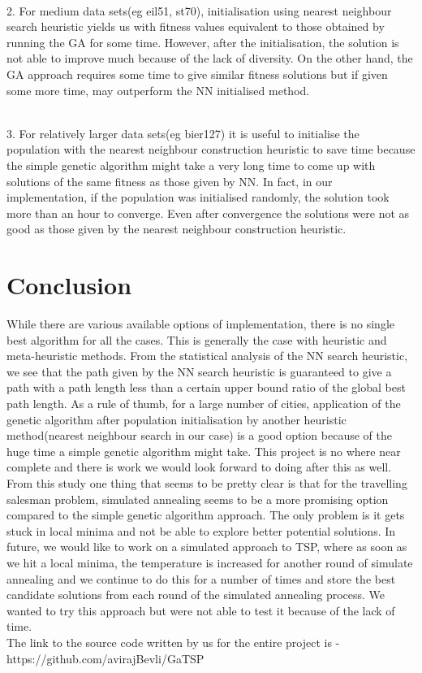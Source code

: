 \documentclass{article}
\begin{document}
\\2.  For medium data sets(eg eil51, st70), initialisation using nearest neighbour search heuristic yields us with fitness values equivalent to those obtained by running the GA for some time. However, after the initialisation, the solution is not able to improve much because of the lack of diversity. On the other hand, the GA approach requires some time to give similar fitness solutions but if given some more time, may outperform the NN initialised method.

\\3.  For relatively larger data sets(eg bier127) it is useful to initialise the population with the nearest neighbour construction heuristic to save time because the simple genetic algorithm might take a very long time to come up with solutions of the same fitness as those given by NN. In fact, in our implementation, if the population was initialised randomly, the solution took more than an hour to converge. Even after convergence the solutions were not as good as those given by the nearest neighbour construction heuristic.


\section{Conclusion}

While there are various available options of implementation, there is no single best algorithm for all the cases. This is generally the case with heuristic and meta-heuristic methods.
From the statistical analysis of the NN search heuristic, we see that the path given by the NN search heuristic is guaranteed to give a path with a path length less than a certain upper bound ratio of the global best path length.
As a rule of thumb, for a large number of cities, application of the genetic algorithm after population initialisation by another heuristic method(nearest neighbour search in our case) is a good option because of the huge time a simple genetic algorithm might take.
This project is no where near complete and there is work we would look forward to doing after this as well. From this study one thing that seems to be pretty clear is that for the travelling salesman problem, simulated annealing seems to be a more promising option compared to the simple genetic algorithm approach. The only problem is it gets stuck in local minima and not be able to explore better potential solutions. In future, we would like to work on a simulated approach to TSP, where as soon as we hit a local minima, the temperature is increased for another round of simulate annealing and we continue to do this for a number of times and store the best candidate solutions from each round of the simulated annealing process. We wanted to try this approach but were not able to test it because of the lack of time.
\vspace{10mm}
\\The link to the source code written by us for the entire project is - 
\\https://github.com/avirajBevli/GaTSP





\end{document}

